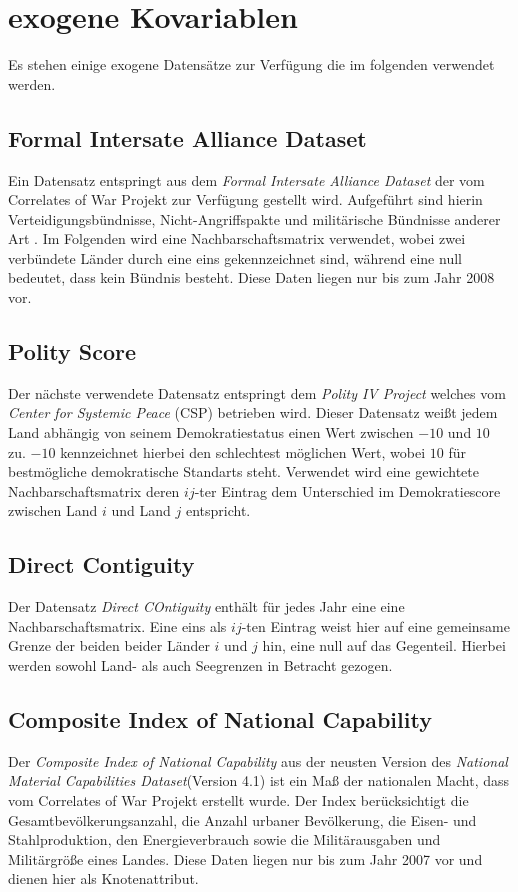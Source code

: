 \documentclass[a4paper,ngerman,oneside,titlepage,bibliography=totoc,11pt]{scrreprt}
\begin{document}
\section{exogene Kovariablen}
\label{sec:exkov}
Es stehen einige exogene Datensätze zur Verfügung die im folgenden verwendet werden.

\subsection{Formal Intersate Alliance Dataset}
Ein Datensatz entspringt aus dem \emph{Formal Intersate Alliance Dataset} \citep{alliance} der vom Correlates of War Projekt zur Verfügung gestellt wird. Aufgeführt sind hierin Verteidigungsbündnisse, Nicht-Angriffspakte und militärische Bündnisse anderer Art . 
Im Folgenden wird  eine Nachbarschaftsmatrix verwendet, wobei zwei verbündete Länder durch eine eins gekennzeichnet sind, während eine null bedeutet, dass kein Bündnis besteht. Diese Daten liegen nur bis zum Jahr 2008 vor.

\subsection{Polity Score}
Der nächste verwendete Datensatz entspringt dem \emph{Polity IV Project} welches vom \emph{Center for Systemic Peace} (CSP) \citep{polity} betrieben wird. Dieser Datensatz weißt jedem Land abhängig von seinem Demokratiestatus einen Wert zwischen $-10$ und $10$ zu. $-10$ kennzeichnet hierbei den schlechtest möglichen Wert, wobei $10$ für bestmögliche demokratische Standarts steht. Verwendet wird eine gewichtete Nachbarschaftsmatrix deren $ij$-ter Eintrag dem Unterschied im Demokratiescore zwischen Land $i$ und Land $j$ entspricht.

\subsection{Direct Contiguity}
Der Datensatz \emph{Direct COntiguity} enthält für jedes Jahr eine eine Nachbarschaftsmatrix. Eine eins als $ij$-ten Eintrag weist hier auf eine gemeinsame Grenze der beiden beider Länder $i$ und $j$ hin, eine null auf das Gegenteil. Hierbei werden sowohl Land- als auch Seegrenzen in Betracht gezogen.

\subsection{Composite Index of National Capability}
Der \emph{Composite Index of National Capability} aus der neusten Version des \emph{National Material Capabilities Dataset}(Version 4.1)  \citep{CINC} ist ein Maß der nationalen Macht, dass vom Correlates of War Projekt erstellt wurde. Der Index berücksichtigt die Gesamtbevölkerungsanzahl, die Anzahl urbaner Bevölkerung, die Eisen- und Stahlproduktion, den Energieverbrauch  sowie die Militärausgaben und Militärgröße eines Landes. Diese Daten liegen nur bis zum Jahr 2007 vor und dienen hier als Knotenattribut.
\end{document}
